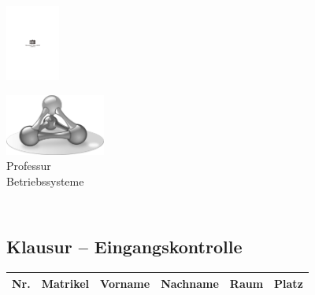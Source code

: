 \documentclass[12pt]{article}
\begin{document}
  \begin{minipage}[c]{4cm}
  \includegraphics[height=2.5cm,width=\textwidth,keepaspectratio]{../lib/TUC}
  \end{minipage}%
  \hfill%
  \begin{minipage}[c]{4cm}
  \includegraphics[height=2cm,width=\textwidth,keepaspectratio]{../lib/logo-sw} \\
  {\scriptsize{Professur\\[-2.5mm] Betriebssysteme}\vspace{1mm}}
  \end{minipage}


\begin{centering}
\section*{\coursename \xspace \coursesemester \\ Klausur -- Eingangskontrolle}
\end{centering}


\begin{tabularx}{\textwidth}{cllllr}
\toprule
Nr. & Matrikel & Vorname & Nachname & Raum & Platz \\
\midrule

\bottomrule
\end{tabularx}
\end{document}

